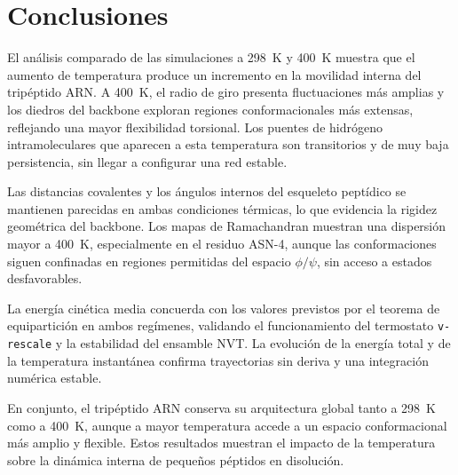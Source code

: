 \documentclass[12pt,a4paper]{article}
\begin{document}
\section{Conclusiones}
El análisis comparado de las simulaciones a \SI{298}{K} y \SI{400}{K} muestra que el
aumento de temperatura produce un incremento en la movilidad interna del
tripéptido ARN. A \SI{400}{K}, el radio de giro presenta fluctuaciones más amplias
y los diedros del backbone exploran regiones conformacionales más extensas,
reflejando una mayor flexibilidad torsional. Los puentes de hidrógeno
intramoleculares que aparecen a esta temperatura son transitorios y de muy baja
persistencia, sin llegar a configurar una red estable.

Las distancias covalentes y los ángulos internos del esqueleto peptídico se
mantienen parecidas en ambas condiciones térmicas, lo que
evidencia la rigidez geométrica del backbone. Los mapas de Ramachandran muestran
una dispersión mayor a \SI{400}{K}, especialmente en el residuo ASN-4, aunque las
conformaciones siguen confinadas en regiones permitidas del espacio
\(\phi/\psi\), sin acceso a estados desfavorables.

La energía cinética media concuerda con los valores previstos por el teorema de
equipartición en ambos regímenes, validando el funcionamiento del termostato
\texttt{v-rescale} y la estabilidad del ensamble NVT. La evolución de la energía
total y de la temperatura instantánea confirma trayectorias sin deriva y una
integración numérica estable.

En conjunto, el tripéptido ARN conserva su arquitectura global tanto a
\SI{298}{K} como a \SI{400}{K}, aunque a mayor temperatura accede a un espacio
conformacional más amplio y flexible. Estos resultados muestran el impacto de la
temperatura sobre la dinámica interna de pequeños péptidos en disolución.
\end{document}
